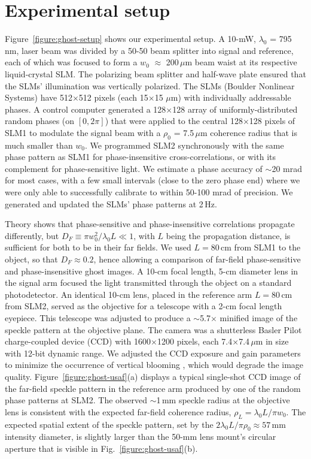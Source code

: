 \section{Experimental setup}

Figure~\ref{figure:ghost-setup} shows our experimental setup.  A 10-mW, $\lambda_0$ = 795\,nm, laser beam was divided by a 50-50 beam splitter into signal and reference, each of which was focused to form a $w_0$ $\approx$ 200\,$\mu$m beam waist at its respective liquid-crystal SLM.  The polarizing beam splitter and half-wave plate ensured that the SLMs' illumination was vertically polarized. The SLMs (Boulder Nonlinear Systems) have 512$\times$512 pixels (each 15$\times$15 $\mu$m) with individually addressable phases. A control computer generated a 128$\times$128 array of uniformly-distributed random phases (on $[0, 2\pi]$) that were applied to the central 128$\times$128 pixels of SLM1 to modulate the signal beam with a $\rho_0$ = 7.5\,$\mu$m  coherence radius that is much smaller than $w_0$.  We programmed SLM2 synchronously with the same phase pattern as SLM1 for phase-insensitive cross-correlations, or with its complement for phase-sensitive light. We estimate a phase accuracy of $\sim$20 mrad for most cases, with a few small intervals (close to the zero phase end) where we were only able to successfully calibrate to within 50-100 mrad of precision. We generated and updated the SLMs' phase patterns at 2\,Hz. 

Theory \cite{erkmen-unified} shows that phase-sensitive and phase-insensitive correlations propagate differently, but $D_F \equiv \pi w_0^2/\lambda_0 L \ll 1$, with $L$ being the propagation distance, is sufficient for both to be in their far fields.  We used $L =80$\,cm from SLM1 to the object, so that $D_F \approx 0.2$, hence allowing a comparison of far-field phase-sensitive and phase-insensitive ghost images.  A 10-cm focal length, 5-cm diameter lens in the signal arm focused the light transmitted through the object on a standard photodetector. An identical 10-cm lens, placed in the reference arm $L = 80\,$cm from SLM2, served as the objective for a telescope with a 2-cm focal length eyepiece.  This telescope was adjusted to produce a $\sim$5.7$\times$ minified image of the speckle pattern at the objective plane. The camera was a shutterless Basler Pilot charge-coupled device (CCD) with 1600$\times$1200 pixels, each 7.4$\times$7.4\,$\mu$m in size with 12-bit dynamic range. We adjusted the CCD exposure and gain parameters to minimize the occurrence of vertical blooming \cite{janesick-astronomical}, which would degrade the image quality. Figure~\ref{figure:ghost-usaf}(a) displays a typical single-shot CCD image of the far-field speckle pattern in the reference arm produced by one of the random phase patterns at SLM2. The observed $\sim$1\,mm speckle radius at the objective lens is consistent with the expected far-field coherence radius, $\rho_L = \lambda_0 L/\pi w_0$. The expected spatial extent of the speckle pattern, set by the $2\lambda_0 L/\pi \rho_0 \approx 57$\,mm intensity diameter, is slightly larger than the 50-mm lens mount's circular aperture that is visible in Fig.~\ref{figure:ghost-usaf}(b).  


